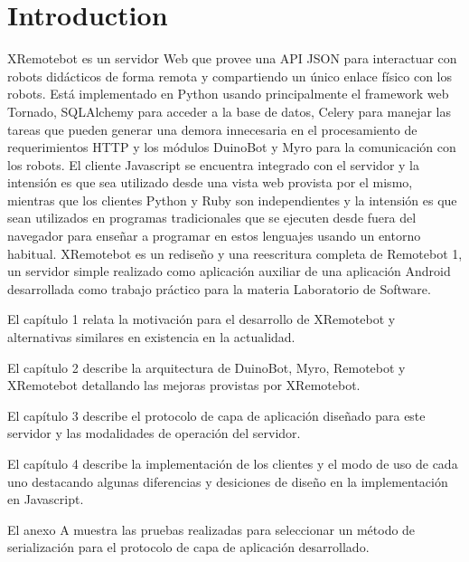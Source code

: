 \chapter{Introduction}

XRemotebot es un servidor Web que provee una API JSON para interactuar
con robots didácticos de forma remota y compartiendo un único enlace
físico con los robots. Está implementado en Python usando principalmente el
framework web Tornado, SQLAlchemy para acceder a la base de datos, Celery
para manejar las tareas que pueden generar una demora innecesaria en el
procesamiento de requerimientos HTTP y los módulos DuinoBot y Myro para
la comunicación con los robots. El cliente Javascript se encuentra
integrado con el servidor y la intensión es que sea utilizado desde una
vista web provista por el mismo, mientras que los clientes Python y Ruby
son independientes y la intensión es que sean utilizados en programas
tradicionales que se ejecuten desde fuera del navegador para enseñar
a programar en estos lenguajes usando un entorno habitual. XRemotebot
es un rediseño y una reescritura completa de Remotebot 1, un servidor
simple realizado como aplicación auxiliar de una aplicación Android
desarrollada
como trabajo práctico para la materia Laboratorio de Software.

El capítulo 1 relata la motivación para el desarrollo de XRemotebot
y alternativas similares en existencia en la actualidad.

El capítulo 2 describe la arquitectura de DuinoBot, Myro, Remotebot y
XRemotebot detallando las mejoras provistas por XRemotebot.

El capítulo 3 describe el protocolo de capa de aplicación diseñado para
este servidor y las modalidades de operación del servidor.

El capítulo 4 describe la implementación de los clientes y el modo de uso
de cada uno destacando algunas diferencias y desiciones de diseño en la
implementación en Javascript.

El anexo A muestra las pruebas realizadas para seleccionar un método
de serialización para el protocolo de capa de aplicación desarrollado.


